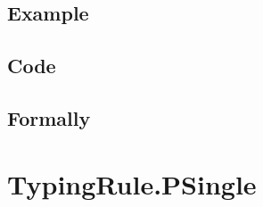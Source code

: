 \documentclass{book}
\begin{document}
  \subsection{Example}

  \subsection{Code}

\begin{emptyformal}
    \subsection{Formally}
\end{emptyformal}


\section{TypingRule.PSingle \label{sec:TypingRule.PSingle}}
\end{document}
